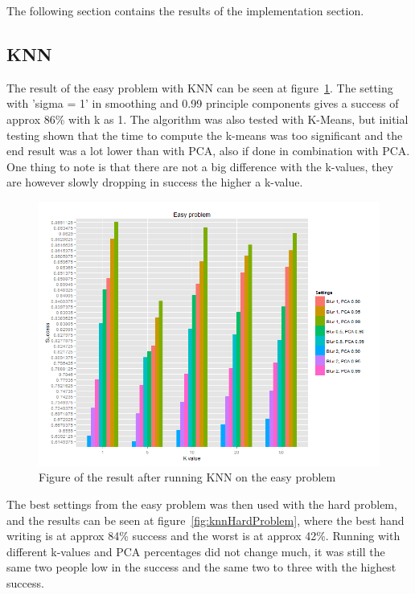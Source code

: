 \documentclass[report]{subfiles}
\begin{document}
The following section contains the results of the implementation section.

\subsection{KNN}
The result of the easy problem with KNN can be seen at figure~\ref{fig:knnEasyProblem}. The setting with 'sigma = 1' in smoothing and 0.99 principle components gives a success of approx 86\% with k as 1. The algorithm was also tested with K-Means, but initial testing shown that the time to compute the k-means was too significant and the end result was a lot lower than with PCA, also if done in combination with PCA.\\
One thing to note is that there are not a big difference with the k-values, they are however slowly dropping in success the higher a k-value.

\begin{figure}[H]
	\centering
	\includegraphics[width=1\textwidth]{images/knnEasyProblem}
	\caption{Figure of the result after running KNN on the easy problem}
	\label{fig:knnEasyProblem}
\end{figure}

The best settings from the easy problem was then used with the hard problem, and the results can be seen at figure~\ref{fig:knnHardProblem}, where the best hand writing is at approx 84\% success and the worst is at approx 42\%. Running with different k-values and PCA percentages did not change much, it was still the same two people low in the success and the same two to three with the highest success.
\end{document}

